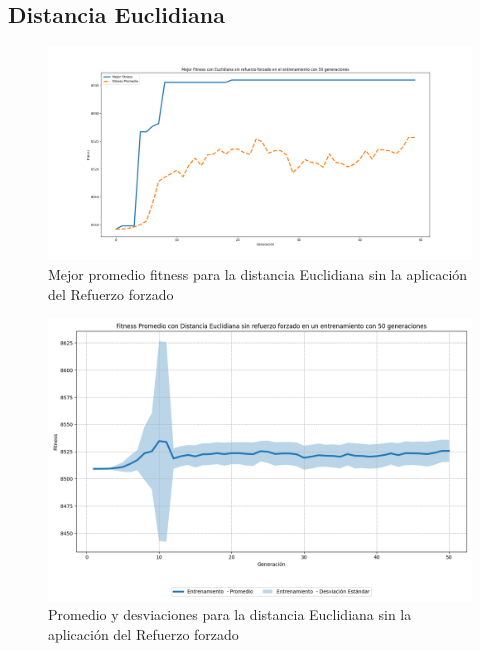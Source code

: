 \documentclass[lettersize, journal]{IEEEtran}
\begin{document}
\subsection{Distancia Euclidiana}
\setcounter{figure}{0}
\renewcommand{\thefigure}{S\arabic{figure}-EN}
\begin{figure}[H]
    \centering
    \includegraphics[width=0.9 \linewidth]{Sin_Refuerzo_50Gen/Eucli_NoRef_50Gen.png}
    \caption{Mejor promedio fitness para la distancia Euclidiana sin la aplicación del Refuerzo forzado}
    \label{fig:eucli_no_ref_50}
\end{figure}
\begin{figure}[H]
    \centering
    \includegraphics[width=0.9 \linewidth]{Sin_Refuerzo_50Gen/Eucli_NoRef_50Gen_Sombra.png}
    \caption{Promedio y desviaciones para la distancia Euclidiana sin la aplicación del Refuerzo forzado}
    \label{fig:eucli_no_ref_50_sombra}    
\end{figure}
\end{document}
